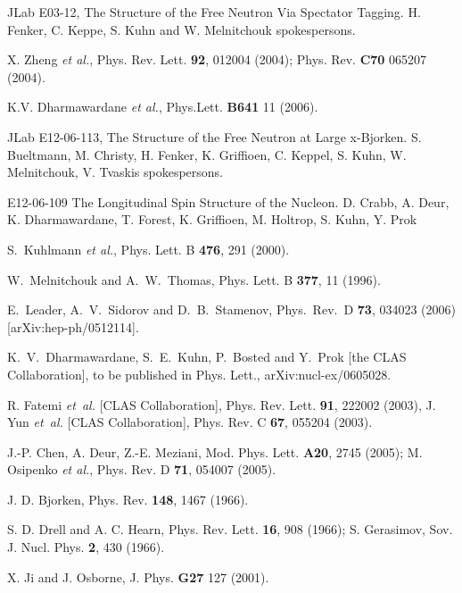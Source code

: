
 JLab E03-12, The Structure of the Free Neutron Via Spectator 
Tagging. H. Fenker, C. Keppe, S. Kuhn and W. Melnitchouk spokespersons.  

X. Zheng {\it et al.},
Phys. Rev. Lett. {\bf 92}, 012004 (2004);
Phys. Rev.  {\bf C70} 065207 (2004).

 K.V. Dharmawardane {\it et al.},
Phys.Lett. {\bf B641} 11 (2006).

 JLab  E12-06-113, The Structure of the Free Neutron at 
Large x-Bjorken. S. Bueltmann, M. Christy, H. Fenker, K. Griffioen, 
C. Keppel, S. Kuhn, W. Melnitchouk, V. Tvaskis spokespersons.  

 E12-06-109 The Longitudinal Spin Structure of the Nucleon. 
D. Crabb, A. Deur, K. Dharmawardane, T. Forest, K. Griffioen, M. Holtrop, 
S. Kuhn, Y. Prok

S.~Kuhlmann {\em et al.},
Phys. Lett. B {\bf 476}, 291 (2000).

W.~Melnitchouk and A.~W.~Thomas,
Phys. Lett. B {\bf 377}, 11 (1996).

  E.~Leader, A.~V.~Sidorov and D.~B.~Stamenov,
  Phys.\ Rev.\ D {\bf 73}, 034023 (2006)
  [arXiv:hep-ph/0512114].

  K.~V.~Dharmawardane, S.~E.~Kuhn, P.~Bosted and Y.~Prok  [the CLAS
                  Collaboration],
  to be published in Phys. Lett., arXiv:nucl-ex/0605028.


R. Fatemi {\it et~al.} [CLAS Collaboration],
Phys. Rev. Lett. {\bf 91}, 222002 (2003),
J. Yun  {\it et~al.} [CLAS Collaboration],
Phys. Rev. C {\bf 67}, 055204 (2003).

J.-P. Chen, A. Deur, Z.-E. Meziani, Mod. Phys. Lett. \textbf{A20}, 2745 (2005);
M. Osipenko {\it et al.}, Phys. Rev. D {\bf 71}, 054007 (2005).


J. D. Bjorken, Phys. Rev. \textbf{148}, 1467 (1966).

S. D. Drell and
A. C. Hearn, Phys. Rev. Lett. \textbf{16}, 908 (1966);
S. Gerasimov, Sov. J. Nucl. Phys. \textbf{2}, 430 (1966).

X. Ji and J. Osborne, J. Phys. {\bf G27} 127 (2001).

